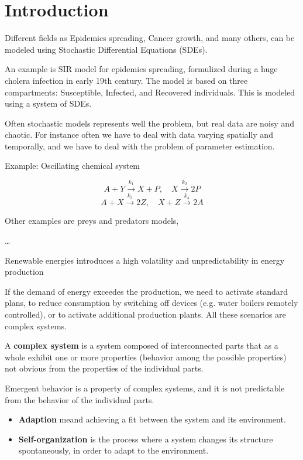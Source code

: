 \chapter{Introduction}

Different fields as Epidemics spreading, Cancer growth, and many others, can be modeled using Stochastic Differential Equations (SDEs).

An example is SIR model for epidemics spreading, formulized during a huge cholera infection in early 19th century. The model is based on three compartments: Susceptible, Infected, and Recovered individuals. This is modeled using a system of SDEs.

Often stochastic models represents well the problem, but real data are noisy and chaotic. For instance often we have to deal with data varying spatially and temporally, and we have to deal with the problem of parameter estimation.

Example: Oscillating chemical system

$$
A + Y \xrightarrow{k_1} X + P, \quad X \xrightarrow{k_2} 2P
$$
$$
A + X \xrightarrow{k_3} 2Z, \quad X + Z \xrightarrow{k_4} 2A
$$

Other examples are preys and predators models, 

\dots

Renewable energies introduces a high volatility and unpredictability in energy production

If the demand of energy exceedes the production, we need to activate standard plans, to reduce consumption by switching off devices (e.g. water boilers remotely controlled), or to activate additional production plants. All these scenarios are complex systems.

\begin{definitionblock}
A \textbf{complex system} is a system composed of interconnected parts that as a whole exhibit one or more properties (behavior among the possible properties) not obvious from the properties of the individual parts.
\end{definitionblock}

Emergent behavior is a property of complex systems, and it is not predictable from the behavior of the individual parts.



\begin{definitionblock}
    \begin{itemize}
        \item \textbf{Adaption} meand achieving a fit between the system and its environment.
        \item \textbf{Self-organization} is the process where a system changes its structure spontaneously, in order to adapt to the environment.
    \end{itemize}
\end{definitionblock} 

